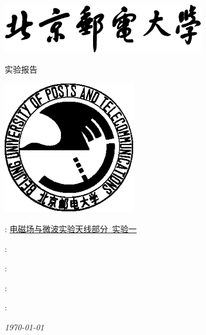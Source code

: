 \begin{titlepage}
    \center
    \includegraphics[width=3.5in]{images/buptname.eps}

    \begin{spacing}{5}
        {\bigsize 实验报告}
    \end{spacing}

    \includegraphics[width=2.3in]{images/buptseal.eps}

    \begin{spacing}{1}
        \vspace{2.5cm}
        : \underline{电磁场与微波实验天线部分~实验一}
        \vspace{3cm}
    \end{spacing}

    \begin{minipage}{0.32\linewidth}
         : \underline{}

         : \underline{}

         : \underline{}

         : \underline{}


    \end{minipage}

    {\small\em \today }
\end{titlepage}

